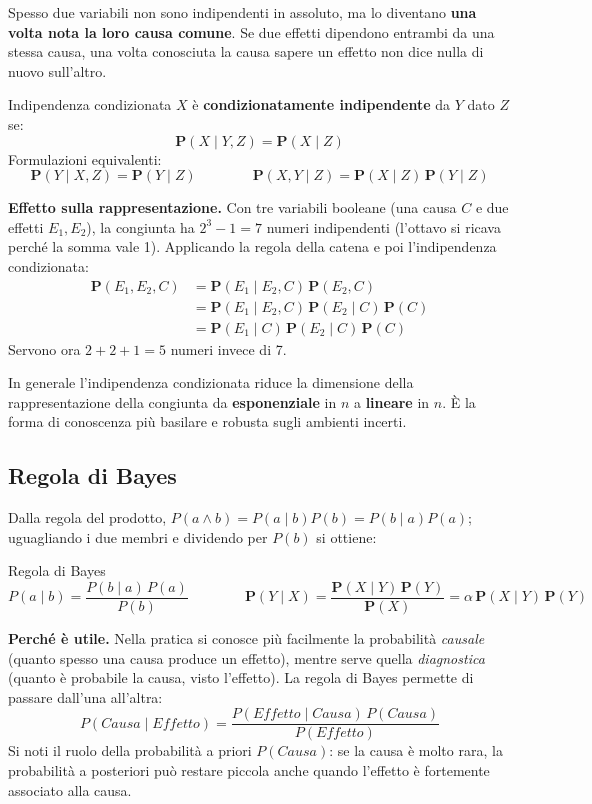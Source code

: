 \documentclass[11pt, a4paper]{article}
\renewcommand{\emph}[1]{\textcolor{verdechiaro}{\itshape #1}}
\newcommand{\Pv}{\mathbf{P}}               %
\begin{document}
Spesso due variabili non sono indipendenti in assoluto, ma lo diventano \textbf{una volta nota la loro causa comune}. Se due effetti dipendono entrambi da una stessa causa, una volta conosciuta la causa sapere un effetto non dice nulla di nuovo sull'altro.

\begin{chiave}{Indipendenza condizionata}
  $X$ è \textbf{condizionatamente indipendente} da $Y$ dato $Z$ se:
  \[
    \Pv(X \mid Y, Z) = \Pv(X \mid Z)
  \]
  Formulazioni equivalenti:
  \[
    \Pv(Y \mid X, Z) = \Pv(Y \mid Z)
    \qquad\qquad
    \Pv(X, Y \mid Z) = \Pv(X \mid Z)\,\Pv(Y \mid Z)
  \]
\end{chiave}

\textbf{Effetto sulla rappresentazione.} Con tre variabili booleane (una causa $C$ e due effetti $E_1, E_2$), la congiunta ha $2^3 - 1 = 7$ numeri indipendenti (l'ottavo si ricava perché la somma vale 1). Applicando la regola della catena e poi l'indipendenza condizionata:
\begin{align*}
  \Pv(E_1, E_2, C)
  &= \Pv(E_1 \mid E_2, C)\,\Pv(E_2, C) \\
  &= \Pv(E_1 \mid E_2, C)\,\Pv(E_2 \mid C)\,\Pv(C) \\
  &= \Pv(E_1 \mid C)\,\Pv(E_2 \mid C)\,\Pv(C)
\end{align*}
Servono ora $2 + 2 + 1 = 5$ numeri invece di 7.

In generale l'indipendenza condizionata riduce la dimensione della rappresentazione della congiunta da \textbf{esponenziale} in $n$ a \textbf{lineare} in $n$. È la forma di conoscenza più basilare e robusta sugli ambienti incerti.

\subsection{Regola di Bayes}

Dalla regola del prodotto, $P(a \land b) = P(a \mid b)P(b) = P(b \mid a)P(a)$; uguagliando i due membri e dividendo per $P(b)$ si ottiene:

\begin{chiave}{Regola di Bayes}
  \[
    P(a \mid b) = \frac{P(b \mid a)\,P(a)}{P(b)}
    \qquad\qquad
    \Pv(Y \mid X) = \frac{\Pv(X \mid Y)\,\Pv(Y)}{\Pv(X)} = \alpha\, \Pv(X \mid Y)\,\Pv(Y)
  \]
\end{chiave}

\textbf{Perché è utile.} Nella pratica si conosce più facilmente la probabilità \emph{causale} (quanto spesso una causa produce un effetto), mentre serve quella \emph{diagnostica} (quanto è probabile la causa, visto l'effetto). La regola di Bayes permette di passare dall'una all'altra:
\[
  P(\mathit{Causa} \mid \mathit{Effetto}) = \frac{P(\mathit{Effetto} \mid \mathit{Causa})\,P(\mathit{Causa})}{P(\mathit{Effetto})}
\]
Si noti il ruolo della probabilità a priori $P(\mathit{Causa})$: se la causa è molto rara, la probabilità a posteriori può restare piccola anche quando l'effetto è fortemente associato alla causa.
\end{document}
